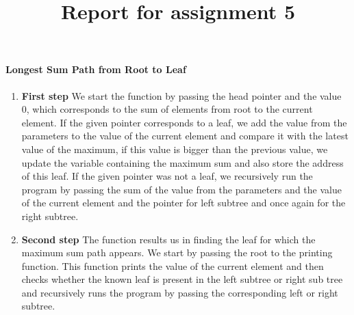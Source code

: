 \documentclass[a4paper,11pt]{article}
\title{Report for assignment 5}
\author{}
\begin{document}
\maketitle

\paragraph{Longest Sum Path from Root to Leaf}
\begin{enumerate}
 \item \textbf{First step}\newline
We start the function by passing the head pointer and the value 0, which corresponds to the sum of elements from root to the current element.\newline
If the given pointer corresponds to a leaf, we add the value from the parameters to the value of the current element and compare it with the latest value of the maximum, if this value is bigger than the previous value, we update the variable containing the maximum sum and also store the address of this leaf.\newline
If the given pointer was not a leaf, we recursively run the program by passing the sum of the value from the parameters and the value of the current element and the pointer for left subtree and once again for the right subtree.\newline
 \item \textbf{Second step}\newline
The function results us in finding the leaf for which the maximum sum path appears.\newline
We start by passing the root to the printing function. This function prints the value of the current element and then checks whether the known leaf is present in the left subtree or right sub tree  and recursively runs the program by passing the corresponding left or right subtree.\newline
\end{enumerate}
\end{document}
